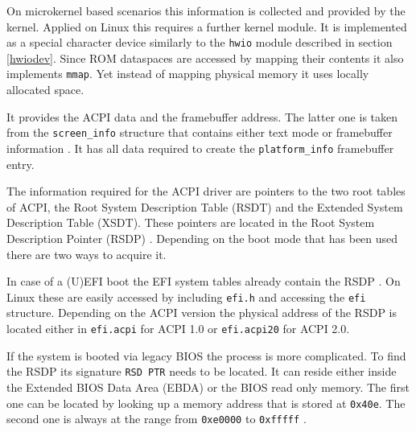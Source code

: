 \documentclass[
a4paper,
12pt,
notitlepage,
parskip=half,
DIV=11,
]{scrbook}
\begin{document}
		On microkernel based scenarios this information is collected and provided by the kernel.
		Applied on Linux this requires a further kernel module.
		It is implemented as a special character device similarly to the \texttt{hwio} module described in section \ref{hwiodev}.
		Since ROM dataspaces are accessed by mapping their contents it also implements \texttt{mmap}.
		Yet instead of mapping physical memory it uses locally allocated space.
		
		It provides the ACPI data and the framebuffer address.
		The latter one is taken from the \texttt{screen\_info} structure that contains either text mode or framebuffer information \citep{zeropage}.
		It has all data required to create the \texttt{platform\_info} framebuffer entry.
		
		The information required for the ACPI driver are pointers to the two root tables of ACPI, the Root System Description Table (RSDT) and the Extended System Description Table (XSDT).
		These pointers are located in the Root System Description Pointer (RSDP) \citep{acpi_spec}.
		Depending on the boot mode that has been used there are two ways to acquire it.
		
		In case of a (U)EFI boot the EFI system tables already contain the RSDP \citep{acpi_spec}.
		On Linux these are easily accessed by including \texttt{efi.h} and accessing the \texttt{efi} structure.
		Depending on the ACPI version the physical address of the RSDP is located either in \texttt{efi.acpi} for ACPI 1.0 or \texttt{efi.acpi20} for ACPI 2.0.
		
		If the system is booted via legacy BIOS the process is more complicated.
		To find the RSDP its signature \texttt{RSD PTR} needs to be located.
		It can reside either inside the Extended BIOS Data Area (EBDA) or the BIOS read only memory.
		The first one can be located by looking up a memory address that is stored at \texttt{0x40e}.
		The second one is always at the range from \texttt{0xe0000} to \texttt{0xfffff} \citep{acpi_spec}.
		
\end{document}
